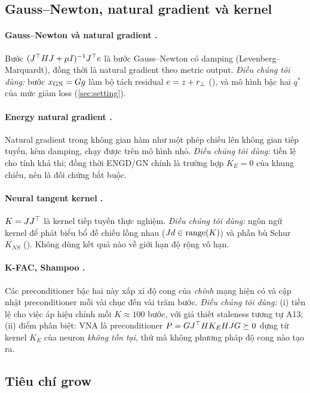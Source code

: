 \subsection{Gauss--Newton, natural gradient và kernel}

\paragraph{Gauss--Newton và natural gradient \cite{amari1998,martens2020}.} Bước $(J^{\top} HJ+\mu I)^{-1}J^{\top} e$ là bước Gauss--Newton có damping (Levenberg--Marquardt), đồng thời là natural gradient theo metric output. \emph{Điều chúng tôi dùng:} bước $x_{\mathrm{GN}}=Gg$ làm bộ tách residual $e=z+r_{\perp}$ (), và mô hình bậc hai $q^*$ của mức giảm loss (\cref{sec:setting}).

\paragraph{Energy natural gradient \cite{muller2023engd}.} Natural gradient trong không gian hàm như một phép chiếu lên không gian tiếp tuyến, kèm damping, chạy được trên mô hình nhỏ. \emph{Điều chúng tôi dùng:} tiền lệ cho tính khả thi; đồng thời ENGD/GN chính là trường hợp $K_E=0$ của khung chiếu, nên là đối chứng bắt buộc.

\paragraph{Neural tangent kernel \cite{jacot2018ntk}.} $K=JJ^{\top}$ là kernel tiếp tuyến thực nghiệm. \emph{Điều chúng tôi dùng:} ngôn ngữ kernel để phát biểu bổ đề chiếu lồng nhau ($Jd\in\operatorname{range}(K)$) và phần bù Schur $K_{NS}$ (). Không dùng kết quả nào về giới hạn độ rộng vô hạn.

\paragraph{K-FAC, Shampoo \cite{martens2015kfac,gupta2018shampoo,purifyingshampoo}.} Các preconditioner bậc hai này xấp xỉ độ cong của \emph{chính} mạng hiện có và cập nhật preconditioner mỗi vài chục đến vài trăm bước. \emph{Điều chúng tôi dùng:} (i) tiền lệ cho việc áp hiệu chỉnh mỗi $K\approx100$ bước, với giả thiết staleness tương tự A13; (ii) điểm phân biệt: VNA là preconditioner $P=GJ^{\top} HK_EHJG\succeq0$ dựng từ kernel $K_E$ của neuron \emph{không tồn tại}, thứ mà không phương pháp độ cong nào tạo ra.

\subsection{Tiêu chí grow}

